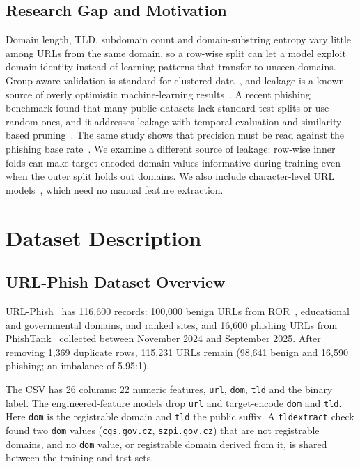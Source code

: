 \documentclass[conference]{IEEEtran}
\begin{document}
\subsection{Research Gap and Motivation}
Domain length, TLD, subdomain count and domain-substring entropy vary little among URLs from the same domain, so a row-wise split can let a model exploit domain identity instead of learning patterns that transfer to unseen domains. Group-aware validation is standard for clustered data~\cite{roberts2017}, and leakage is a known source of overly optimistic machine-learning results~\cite{kapoor2023}. A recent phishing benchmark found that many public datasets lack standard test splits or use random ones, and it addresses leakage with temporal evaluation and similarity-based pruning~\cite{dalton2025}. The same study shows that precision must be read against the phishing base rate~\cite{dalton2025}. We examine a different source of leakage: row-wise inner folds can make target-encoded domain values informative during training even when the outer split holds out domains. We also include character-level URL models~\cite{alshehri2022}, which need no manual feature extraction.

\section{Dataset Description}

\subsection{URL-Phish Dataset Overview}
URL-Phish~\cite{linh2026} has 116{,}600 records: 100{,}000 benign URLs from ROR~\cite{ror2025}, educational and governmental domains, and ranked sites, and 16{,}600 phishing URLs from PhishTank~\cite{phishtank} collected between November 2024 and September 2025. After removing 1{,}369 duplicate rows, 115{,}231 URLs remain (98{,}641 benign and 16{,}590 phishing; an imbalance of 5.95:1).

The CSV has 26 columns: 22 numeric features, \texttt{url}, \texttt{dom}, \texttt{tld} and the binary label. The engineered-feature models drop \texttt{url} and target-encode \texttt{dom} and \texttt{tld}. Here \texttt{dom} is the registrable domain and \texttt{tld} the public suffix. A \texttt{tldextract} check found two \texttt{dom} values (\texttt{cgs.gov.cz}, \texttt{szpi.gov.cz}) that are not registrable domains, and no \texttt{dom} value, or registrable domain derived from it, is shared between the training and test sets.
\end{document}
